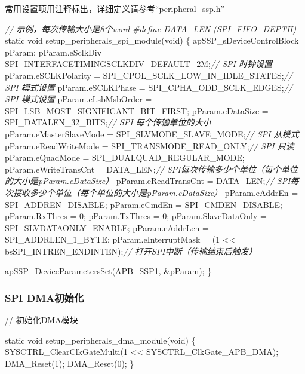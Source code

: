 \documentclass[
  12pt,
]{book}
\newenvironment{Shaded}{\begin{snugshade}}{\end{snugshade}}
\newcommand{\CommentTok}[1]{\textcolor[rgb]{0.56,0.35,0.01}{\textit{#1}}}
\newcommand{\DataTypeTok}[1]{\textcolor[rgb]{0.13,0.29,0.53}{#1}}
\newcommand{\DecValTok}[1]{\textcolor[rgb]{0.00,0.00,0.81}{#1}}
\newcommand{\NormalTok}[1]{#1}
\newcommand{\PreprocessorTok}[1]{\textcolor[rgb]{0.56,0.35,0.01}{\textit{#1}}}
\begin{document}
常用设置项用注释标出，详细定义请参考``peripheral\_ssp.h''

\begin{Shaded}
\begin{Highlighting}[]
\CommentTok{// 示例，每次传输大小是8个word}
\PreprocessorTok{#define DATA_LEN (SPI_FIFO_DEPTH)}
\DataTypeTok{static} \DataTypeTok{void}\NormalTok{ setup_peripherals_spi_module(}\DataTypeTok{void}\NormalTok{)}
\NormalTok{\{}
\NormalTok{    apSSP_sDeviceControlBlock pParam;}
\NormalTok{    pParam.eSclkDiv = SPI_INTERFACETIMINGSCLKDIV_DEFAULT_2M;}\CommentTok{// SPI 时钟设置}
\NormalTok{    pParam.eSCLKPolarity = SPI_CPOL_SCLK_LOW_IN_IDLE_STATES;}\CommentTok{// SPI 模式设置}
\NormalTok{    pParam.eSCLKPhase = SPI_CPHA_ODD_SCLK_EDGES;}\CommentTok{// SPI 模式设置}
\NormalTok{    pParam.eLsbMsbOrder = SPI_LSB_MOST_SIGNIFICANT_BIT_FIRST;}
\NormalTok{    pParam.eDataSize = SPI_DATALEN_32_BITS;}\CommentTok{// SPI 每个传输单位的大小}
\NormalTok{    pParam.eMasterSlaveMode = SPI_SLVMODE_SLAVE_MODE;}\CommentTok{// SPI 从模式}
\NormalTok{    pParam.eReadWriteMode = SPI_TRANSMODE_READ_ONLY;}\CommentTok{// SPI 只读}
\NormalTok{    pParam.eQuadMode = SPI_DUALQUAD_REGULAR_MODE;}
\NormalTok{    pParam.eWriteTransCnt = DATA_LEN;}\CommentTok{// SPI每次传输多少个单位（每个单位的大小是pParam.eDataSize）}
\NormalTok{    pParam.eReadTransCnt = DATA_LEN;}\CommentTok{// SPI每次接收多少个单位（每个单位的大小是pParam.eDataSize）}
\NormalTok{    pParam.eAddrEn = SPI_ADDREN_DISABLE;}
\NormalTok{    pParam.eCmdEn = SPI_CMDEN_DISABLE;}
\NormalTok{    pParam.RxThres = }\DecValTok{0}\NormalTok{;}
\NormalTok{    pParam.TxThres = }\DecValTok{0}\NormalTok{;}
\NormalTok{    pParam.SlaveDataOnly = SPI_SLVDATAONLY_ENABLE;}
\NormalTok{    pParam.eAddrLen = SPI_ADDRLEN_1_BYTE;}
\NormalTok{    pParam.eInterruptMask = (}\DecValTok{1}\NormalTok{ << bsSPI_INTREN_ENDINTEN);}\CommentTok{// 打开SPI中断（传输结束后触发）}
  
\NormalTok{    apSSP_DeviceParametersSet(APB_SSP1, &pParam);}
\NormalTok{\}}
\end{Highlighting}
\end{Shaded}

\hypertarget{spi-dmaux521dux59cbux5316-1}{%
\subsubsection{SPI DMA初始化}\label{spi-dmaux521dux59cbux5316-1}}

// 初始化DMA模块

\begin{Shaded}
\begin{Highlighting}[]
\DataTypeTok{static} \DataTypeTok{void}\NormalTok{ setup_peripherals_dma_module(}\DataTypeTok{void}\NormalTok{)}
\NormalTok{\{}
\NormalTok{    SYSCTRL_ClearClkGateMulti(}\DecValTok{1}\NormalTok{ << SYSCTRL_ClkGate_APB_DMA);}
\NormalTok{    DMA_Reset(}\DecValTok{1}\NormalTok{);}
\NormalTok{    DMA_Reset(}\DecValTok{0}\NormalTok{);}
\NormalTok{\}}
\end{Highlighting}
\end{Shaded}
\end{document}
